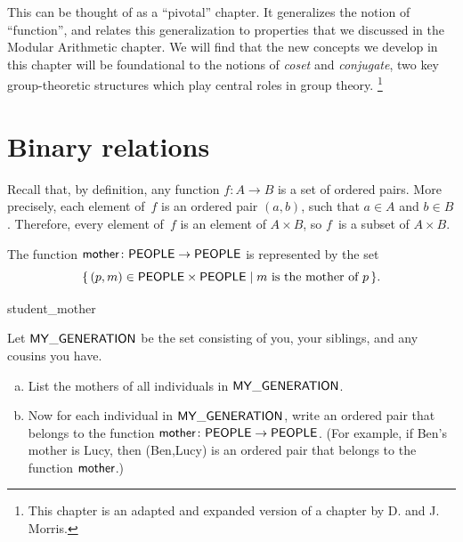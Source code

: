 


\newcommand{\class}[1]{\overline{#1}}
\newcommand{\divides}{\mbox{|}}

\medskip\noindent

This can be thought of as a ``pivotal'' chapter. It generalizes the notion of ``function'', and relates this generalization to properties that we discussed in the Modular Arithmetic chapter. We will find that the new concepts we develop in this chapter will be foundational to the notions of \emph{coset} and \emph{conjugate}, two key group-theoretic structures which play central roles in group theory.
\footnote{This chapter  is an adapted and expanded version of a chapter by D. and J. Morris.}

\section{Binary relations} \label{sec.relation}


 Recall that, by definition, any function $f \colon A \to B$ is a set of ordered pairs. More precisely, each element of~$f$ is an ordered pair $(a,b)$, such that $a \in A$ and $b \in B$. Therefore, every element of~$f$ is an element of $A \times B$, so $f$~is a subset of $A \times B$.


\begin{eg} 
The function $\sf{mother} \colon \sf{PEOPLE} \to \sf{PEOPLE}$ is represented by the set
\[ \{\, (p,m)  \in  {\sf{P}EOPLE} \times {\sf{P}EOPLE}  \mid  m  \text{  is the mother of } p \,\} .\]
\end{eg}

\begin{exercise}{student_mother}

\noindent
Let $\sf{MY\_GENERATION}$ be the set consisting  of you, your siblings, and any cousins you have.  
\begin{enumerate}[(a)]
\item
List the mothers of all individuals in $\sf{MY\_GENERATION}$.
\item
Now for each individual in $\sf{MY\_GENERATION}$, write an ordered pair that belongs to the function $\sf{mother} \colon \sf{PEOPLE} \to \sf{PEOPLE}$. (For example, if Ben's  mother is Lucy, then (Ben,Lucy) is an ordered pair that belongs to the function $\sf{mother}$.)
\end{enumerate}
\end{exercise}


